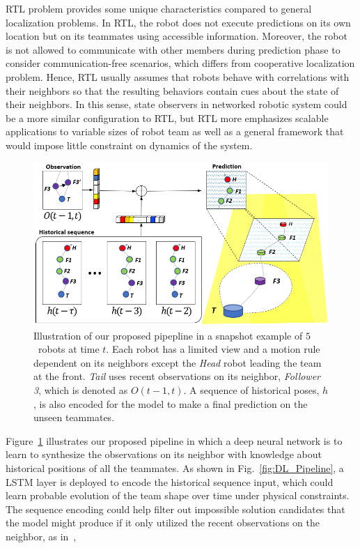 \documentclass[letterpaper, 10 pt, conference]{ieeeconf}  %
\begin{document}
	RTL problem provides some unique characteristics compared to general localization problems.
	In RTL, the robot does not execute predictions on its own location but on
	its teammates using accessible information.
	Moreover, the robot is not allowed to communicate with other members during
	prediction phase to consider communication-free scenarios, which differs from
	cooperative localization problem.
	Hence, RTL usually assumes that robots behave with correlations with their neighbors
	so that the resulting behaviors contain cues about the state of their neighbors.
	In this sense, state observers in networked robotic system could be a more similar
	configuration to RTL, but RTL more emphasizes
	scalable applications to variable sizes of robot team as well as a general framework
	that would impose little constraint on dynamics of the system.

	\begin{figure}\centering
		\includegraphics[width=1.\columnwidth]{fig_Concept}
		\caption{Illustration of our proposed pipepline in a snapshot example of
			$5$~robots at time $t$.
			Each robot has a limited view and a motion rule dependent on its neighbors
			except the \emph{Head} robot leading the team at the front.
			\emph{Tail} uses recent observations on its neighbor, \emph{Follower 3},
			which is denoted as $O(t-1,t)$. A sequence of historical poses, $h$, is
			also encoded for the model to make a final prediction on the
			unseen teammates.
		}
		\label{fig:Concept}
	\end{figure}

	Figure~\ref{fig:Concept} illustrates our proposed pipeline in which
	a deep neural network is to learn to synthesize the observations on its neighbor
	with knowledge about historical positions of all the teammates.
	As shown in Fig.~\ref{fig:DL_Pipeline}, a LSTM layer is deployed to encode
	the historical sequence input, which could learn probable evolution of the
	team shape over time under physical constraints.
	The sequence encoding could help filter out impossible solution candidates
	that the model might produce if it only utilized the recent observations on
	the neighbor, as in~\cite{CPR17},
\end{document}
